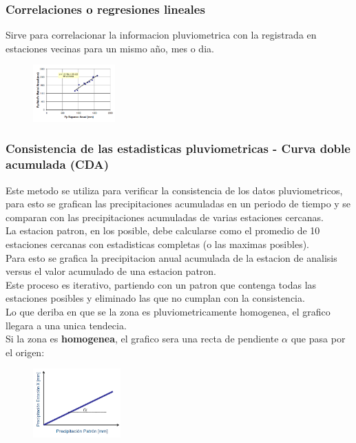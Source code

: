 \subsubsection{Correlaciones o regresiones lineales}

Sirve para correlacionar la informacion pluviometrica con la registrada en estaciones vecinas para un mismo año, mes o dia.\\

\begin{figure}[H]
    \centering
    \includegraphics[width=0.28\textwidth]{imagenes/correlacion_anual.png}
    \label{correlacion}
\end{figure}

\subsubsection{Consistencia de las estadisticas pluviometricas - Curva doble acumulada (CDA)}

Este metodo se utiliza para verificar la consistencia de los datos pluviometricos, para esto se grafican las precipitaciones acumuladas en un periodo de tiempo y se comparan con las precipitaciones acumuladas de varias estaciones cercanas.\\

La estacion patron, en los posible, debe calcularse como el promedio de 10 estaciones cercanas con estadisticas completas (o las maximas posibles).\\

Para esto se grafica la precipitacion anual acumulada de la estacion de analisis versus el valor acumulado de una estacion patron.\\

Este proceso es iterativo, partiendo con un patron que contenga todas las estaciones posibles y eliminado las que no cumplan con la consistencia.\\

Lo que deriba en que se la zona es pluviometricamente homogenea, el grafico llegara a una unica tendecia.\\

Si la zona es \textbf{homogenea}, el grafico sera una recta de pendiente $\alpha$ que pasa por el origen: \\
\begin{figure}[H]
    \centering
    \includegraphics[width=0.3\textwidth]{imagenes/cda_homo.png}
    \label{cda_homo}
\end{figure}

